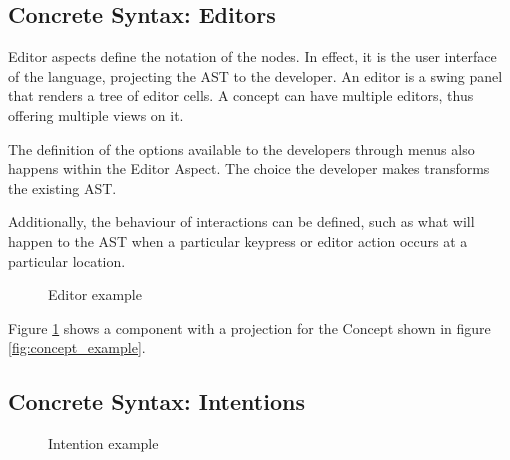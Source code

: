 \subsection{Concrete Syntax: Editors}
Editor aspects define the notation of the nodes.
In effect, it is the user interface of the language, projecting the AST to the developer.
An editor is a swing panel that renders a tree of editor cells.
A concept can have multiple editors, thus offering multiple views on it.

The definition of the options available to the developers through menus also happens within the Editor Aspect. 
The choice the developer makes transforms the existing AST.

Additionally, the behaviour of interactions can be defined, such as what will happen to the AST when a particular keypress or editor action occurs at a particular location.

\begin{figure}
    \centering
    \caption{Editor example}
    \label{fig:editor_example}
\end{figure}

Figure \ref{fig:editor_example} shows a component with a projection for the Concept shown in figure \ref{fig:concept_example}.
 
\subsection{Concrete Syntax: Intentions}

\begin{figure}
    \centering
    \caption{Intention example}
    \label{fig:intention_example}
\end{figure}

